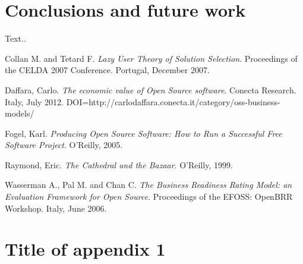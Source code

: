 \documentclass[a4paper, 12pt]{book}
\begin{document}
%
\chapter{Conclusions and future work}
\label{chap:conclusions}

Text..

%
\renewcommand{\bibname}{References}

\begin{thebibliography}{25}
  


   Collan M. and Tetard F. \textit{Lazy User Theory of Solution Selection}. Proceedings of the CELDA 2007 Conference. Portugal, December 2007.

   Daffara, Carlo. \textit{The economic value of Open Source software}. Conecta Research. Italy, July 2012. DOI=http://carlodaffara.conecta.it/category/oss-business-models/

   Fogel, Karl. \textit{Producing Open Source Software: How to Run a Successful Free Software Project}. O'Reilly, 2005.

   Raymond, Eric. \textit{The Cathedral and the Bazaar}. O'Reilly, 1999.

   Wasserman A., Pal M. and Chan C. \textit{The Business Readiness Rating Model: an Evaluation Framework for Open Source}. Proceedings of the EFOSS: OpenBRR Workshop. Italy, June 2006.


\end{thebibliography}

%
\appendix
\chapter{Title of appendix 1}
\label{app:apendix1}
\end{document}
